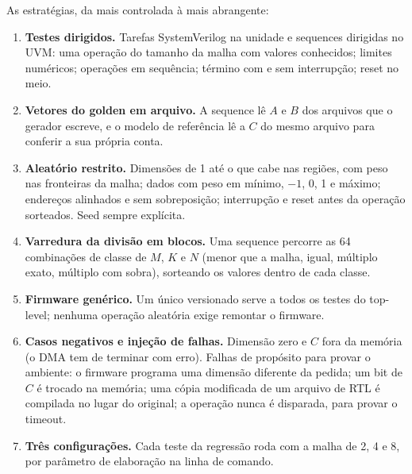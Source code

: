 \documentclass[10pt,a4paper]{article}
\newcommand{\code}[1]{\texttt{\detokenize{#1}}}
\begin{document}
As estratégias, da mais controlada à mais abrangente:

\begin{enumerate}
  \item \textbf{Testes dirigidos.} Tarefas SystemVerilog na unidade e sequences dirigidas no UVM:
  uma operação do tamanho da malha com valores conhecidos; limites numéricos; operações em
  sequência; término com e sem interrupção; reset no meio.
  \item \textbf{Vetores do golden em arquivo.} A sequence lê $A$ e $B$ dos arquivos que o gerador
  escreve, e o modelo de referência lê a $C$ do mesmo arquivo para conferir a sua própria conta.
  \item \textbf{Aleatório restrito.} Dimensões de 1 até o que cabe nas regiões, com peso nas
  fronteiras da malha; dados com peso em mínimo, $-1$, 0, 1 e máximo; endereços alinhados e sem
  sobreposição; interrupção e reset antes da operação sorteados. Seed sempre explícita.
  \item \textbf{Varredura da divisão em blocos.} Uma sequence percorre as 64 combinações de classe
  de $M$, $K$ e $N$ (menor que a malha, igual, múltiplo exato, múltiplo com sobra), sorteando os
  valores dentro de cada classe.
  \item \textbf{Firmware genérico.} Um único \code{.hex} versionado serve a todos os testes do
  top-level; nenhuma operação aleatória exige remontar o firmware.
  \item \textbf{Casos negativos e injeção de falhas.} Dimensão zero e $C$ fora da memória (o DMA
  tem de terminar com erro). Falhas de propósito para provar o ambiente: o firmware programa uma
  dimensão diferente da pedida; um bit de $C$ é trocado na memória; uma cópia modificada de um
  arquivo de RTL é compilada no lugar do original; a operação nunca é disparada, para provar o
  timeout.
  \item \textbf{Três configurações.} Cada teste da regressão roda com a malha de 2, 4 e 8, por
  parâmetro de elaboração na linha de comando.
\end{enumerate}
\end{document}
